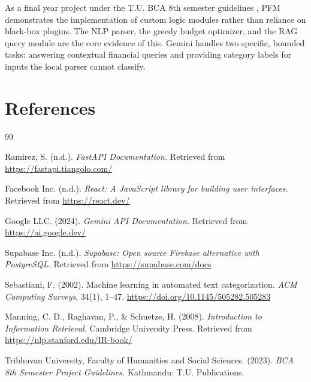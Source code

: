 \documentclass[12pt, a4paper]{article}
\begin{document}
As a final year project under the T.U. BCA 8th semester guidelines \cite{tuguide}, PFM demonstrates the implementation of custom logic modules rather than reliance on black-box plugins. The NLP parser, the greedy budget optimizer, and the RAG query module are the core evidence of this. Gemini handles two specific, bounded tasks: answering contextual financial queries and providing category labels for inputs the local parser cannot classify.

\newpage
\section{References}

\begin{thebibliography}{99}

Ramirez, S. (n.d.). \textit{FastAPI Documentation.} Retrieved from \url{https://fastapi.tiangolo.com/}

Facebook Inc. (n.d.). \textit{React: A JavaScript library for building user interfaces.} Retrieved from \url{https://react.dev/}

Google LLC. (2024). \textit{Gemini API Documentation.} Retrieved from \url{https://ai.google.dev/}

Supabase Inc. (n.d.). \textit{Supabase: Open source Firebase alternative with PostgreSQL.} Retrieved from \url{https://supabase.com/docs}

Sebastiani, F. (2002). Machine learning in automated text categorization. \textit{ACM Computing Surveys}, 34(1), 1--47. \url{https://doi.org/10.1145/505282.505283}

Manning, C. D., Raghavan, P., \& Schuetze, H. (2008). \textit{Introduction to Information Retrieval.} Cambridge University Press. Retrieved from \url{https://nlp.stanford.edu/IR-book/}

Tribhuvan University, Faculty of Humanities and Social Sciences. (2023). \textit{BCA 8th Semester Project Guidelines.} Kathmandu: T.U. Publications.

\end{thebibliography}
\end{document}
